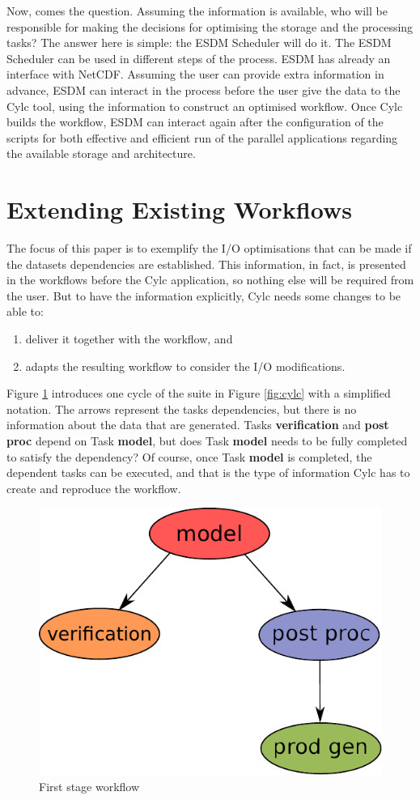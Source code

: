 \documentclass[a4paper]{article}
\begin{document}
Now, comes the question. Assuming the information is available, who will be responsible for making the decisions for optimising the storage and the processing tasks? The answer here is simple: the ESDM Scheduler will do it. The ESDM Scheduler can be used in different steps of the process. ESDM has already an interface with NetCDF. Assuming the user can provide extra information in advance, ESDM can interact in the process before the user give the data to the Cylc tool, using the information to construct an optimised workflow. Once Cylc builds the workflow, ESDM can interact again after the configuration of the scripts for both effective and efficient run of the parallel applications regarding the available storage and architecture.

\section{Extending Existing Workflows}

The focus of this paper is to exemplify the I/O optimisations that can be made if the datasets dependencies are established. This information, in fact, is presented in the workflows before the Cylc application, so nothing else will be required from the user. But to have the information explicitly, Cylc needs some changes to be able to:

\begin{enumerate}

\item deliver it together with the workflow, and

\item adapts the resulting workflow to consider the I/O modifications.

\end{enumerate}

Figure \ref{fig:cycle1} introduces one cycle of the suite in Figure \ref{fig:cylc} with a simplified notation. The arrows represent the tasks dependencies, but there is no information about the data that are generated. Tasks \textbf{verification} and \textbf{post\,proc} depend on Task \textbf{model}, but does Task \textbf{model} needs to be fully completed to satisfy the dependency? Of course, once Task \textbf{model} is completed, the dependent tasks can be executed, and that is the type of information Cylc has to create and reproduce the workflow.

\begin{figure}[H]
  \centering
  \includegraphics[width=0.4\columnwidth]{cycle1}
  \caption{First stage workflow}
  \label{fig:cycle1}
\end{figure}
\end{document}
